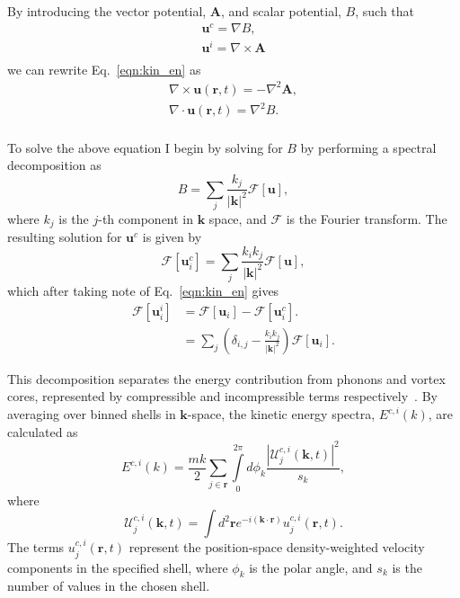 By introducing the vector potential, $\mathbf{A}$, and scalar potential, $B$, such that
\begin{subequations}
\begin{align}
    \mathbf{u}^c = \nabla B, \\
    \mathbf{u}^i = \nabla \times \mathbf{A} \\
\end{align}
\end{subequations}
we can rewrite Eq.~\eqref{eqn:kin_en} as
\begin{align}
    \nabla \times \mathbf{u}(\mathbf{r},t) = -\nabla^2 \mathbf{A}, \\
    \nabla \cdot \mathbf{u}(\mathbf{r},t) = \nabla^2 {B}. \\
\end{align}

To solve the above equation I begin by solving for $B$ by performing a spectral decomposition as
\begin{equation}
    B = \displaystyle\sum\limits_{j} \frac{k_j}{|\mathbf{k}|^2}\mathscr{F}[\mathbf{u}],
\end{equation}
where $k_j$ is the $j$-th component in $\mathbf{k}$ space, and $\mathscr{F}$ is the Fourier transform. The resulting solution for $\mathbf{u}^c$ is given by
\begin{equation}
    \mathscr{F}[\mathbf{u}_i^c] = \displaystyle\sum\limits_{j} \frac{k_i k_j}{|\mathbf{k}|^2} \mathscr{F}[\mathbf{u}],
\end{equation}
which after taking note of Eq.~\eqref{eqn:kin_en} gives
\begin{align}
    \mathscr{F}[\mathbf{u}_i^i] &= \mathscr{F}[\mathbf{u}_i] - \mathscr{F}[\mathbf{u}_i^c]. \\
    &= \displaystyle\sum\limits_{j}\left(\delta_{i,j} - \frac{k_ik_j}{|\mathbf{k}|^2}\right)\mathscr{F}[\mathbf{u}_i].
\end{align}

This decomposition separates the energy contribution from phonons and vortex cores, represented by compressible and incompressible terms respectively~\cite{CT:Horng_pra_2009}. By averaging over binned shells in $\mathbf{k}$-space, the kinetic energy spectra, $E^{c,i}(k)$, are calculated as~\cite{CT:Bradley_prx_2012}
\begin{equation}
	E^{c,i}(k) = \frac{mk}{2}\sum\limits_{j\in\mathbf{r}} \int\limits_{0}^{2\pi}d\phi_k \frac{ |\mathcal{U}_j^{c,i}(\mathbf{k},t) |^2}{s_k},
\end{equation}
where
\begin{equation}
	\mathcal{U}_j^{c,i}(\mathbf{k},t) = \int d^2 \mathbf{r} e^{-i(\mathbf{k}\cdot\mathbf{r})} u_j^{c,i}(\mathbf{r},t).
\end{equation}
The terms $u_j^{c,i}(\mathbf{r},t)$ represent the position-space density-weighted velocity components in the specified shell, where $\phi_k$ is the polar angle, and $s_k$ is the number of values in the chosen shell.
\fi

